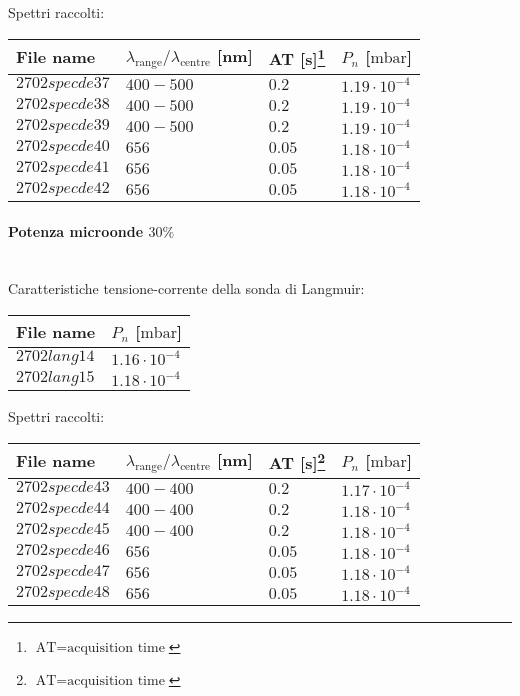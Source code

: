 Spettri raccolti:
\begin{center}
\begin{tabular}{p{3cm}p{4cm}p{2cm}p{3cm}}
\toprule
File name	&$\lambda_\text{range}\text{/}\lambda_\text{centre}$ [nm] &AT [s]\footnote{$\text{AT}=\text{acquisition time}$} &$P_{n}$ [$\si{\milli\bar}$]\\
\midrule
$2702specde37$	&$400-500$	&$0.2$		&$1.19\cdot10^{-4}$\\
$2702specde38$	&$400-500$	&$0.2$		&$1.19\cdot10^{-4}$\\
$2702specde39$	&$400-500$	&$0.2$		&$1.19\cdot10^{-4}$\\
$2702specde40$	&$656$		&$0.05$		&$1.18\cdot10^{-4}$\\
$2702specde41$	&$656$		&$0.05$		&$1.18\cdot10^{-4}$\\
$2702specde42$	&$656$		&$0.05$		&$1.18\cdot10^{-4}$\\

\bottomrule
\end{tabular}
\end{center}

\paragraph*{Potenza microonde $\text{30\%}$} ~\\
Caratteristiche tensione-corrente della sonda di Langmuir:
\begin{center}
  \begin{tabular}{p{3cm}p{3cm}}
  \toprule
File name	&$P_{n}$ [$\si{\milli\bar}$]\\
  \midrule
$2702lang14$	&$1.16\cdot10^{-4}$\\
$2702lang15$	&$1.18\cdot10^{-4}$\\

  \bottomrule
  \end{tabular}
\end{center}

Spettri raccolti:
\begin{center}
\begin{tabular}{p{3cm}p{4cm}p{2cm}p{3cm}}
\toprule
File name	&$\lambda_\text{range}\text{/}\lambda_\text{centre}$ [nm] &AT [s]\footnote{$\text{AT}=\text{acquisition time}$} &$P_{n}$ [$\si{\milli\bar}$]\\
\midrule
$2702specde43$	&$400-400$	&$0.2$		&$1.17\cdot10^{-4}$\\
$2702specde44$	&$400-400$	&$0.2$		&$1.18\cdot10^{-4}$\\
$2702specde45$	&$400-400$	&$0.2$		&$1.18\cdot10^{-4}$\\
$2702specde46$	&$656$		&$0.05$		&$1.18\cdot10^{-4}$\\
$2702specde47$	&$656$		&$0.05$		&$1.18\cdot10^{-4}$\\
$2702specde48$	&$656$		&$0.05$		&$1.18\cdot10^{-4}$\\

\bottomrule
\end{tabular}
\end{center}

